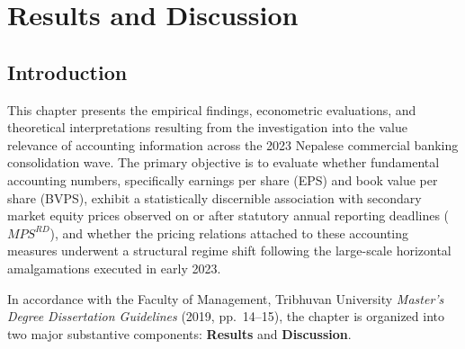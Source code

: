 \chapter{Results and Discussion}

\section{Introduction}
This chapter presents the empirical findings, econometric evaluations, and theoretical interpretations resulting from the investigation into the value relevance of accounting information across the 2023 Nepalese commercial banking consolidation wave. The primary objective is to evaluate whether fundamental accounting numbers, specifically earnings per share (EPS) and book value per share (BVPS), exhibit a statistically discernible association with secondary market equity prices observed on or after statutory annual reporting deadlines ($\mathit{MPS}^{RD}$), and whether the pricing relations attached to these accounting measures underwent a structural regime shift following the large-scale horizontal amalgamations executed in early 2023.

In accordance with the Faculty of Management, Tribhuvan University \textit{Master's Degree Dissertation Guidelines} (2019, pp.~14--15), the chapter is organized into two major substantive components: \textbf{Results} and \textbf{Discussion}.

